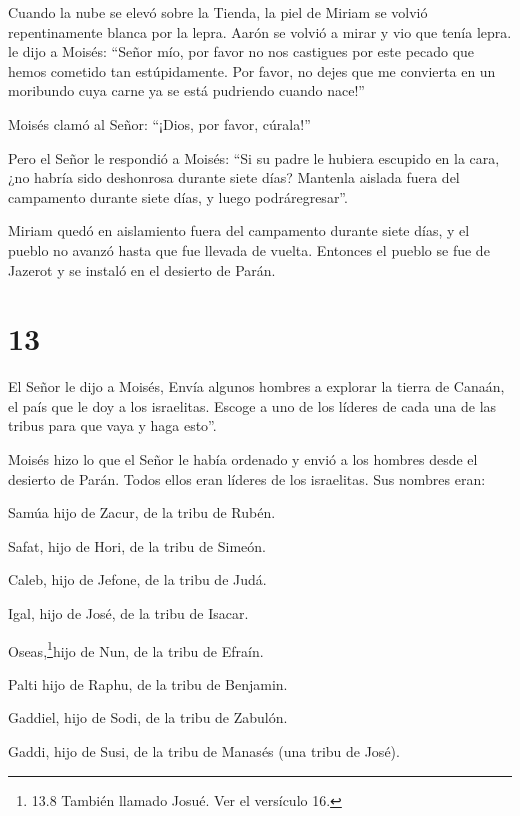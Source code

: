  Cuando la nube se elevó sobre la Tienda, la piel de Miriam
se volvió repentinamente blanca por la lepra. Aarón se volvió a mirar y
vio que tenía lepra.  le dijo a Moisés: ``Señor mío, por
favor no nos castigues por este pecado que hemos cometido tan
estúpidamente.  Por favor, no dejes que me convierta en un
moribundo cuya carne ya se está pudriendo cuando nace!''

 Moisés clamó al Señor: ``¡Dios, por favor, cúrala!''

 Pero el Señor le respondió a Moisés: ``Si su padre le
hubiera escupido en la cara, ¿no habría sido deshonrosa durante siete
días? Mantenla aislada fuera del campamento durante siete días, y luego
podráregresar''.

 Miriam quedó en aislamiento fuera del campamento durante
siete días, y el pueblo no avanzó hasta que fue llevada de vuelta.
 Entonces el pueblo se fue de Jazerot y se instaló en el
desierto de Parán.

\hypertarget{section-12}{%
\section{13}\label{section-12}}

 El Señor le dijo a Moisés,  Envía algunos
hombres a explorar la tierra de Canaán, el país que le doy a los
israelitas. Escoge a uno de los líderes de cada una de las tribus para
que vaya y haga esto''.

 Moisés hizo lo que el Señor le había ordenado y envió a los
hombres desde el desierto de Parán. Todos ellos eran líderes de los
israelitas.  Sus nombres eran:

Samúa hijo de Zacur, de la tribu de Rubén.

 Safat, hijo de Hori, de la tribu de Simeón.

 Caleb, hijo de Jefone, de la tribu de Judá.

 Igal, hijo de José, de la tribu de Isacar.

 Oseas,\footnote{13.8 También llamado Josué. Ver el
  versículo 16.}hijo de Nun, de la tribu de Efraín.

 Palti hijo de Raphu, de la tribu de Benjamin.

 Gaddiel, hijo de Sodi, de la tribu de Zabulón.

 Gaddi, hijo de Susi, de la tribu de Manasés (una tribu de
José).

